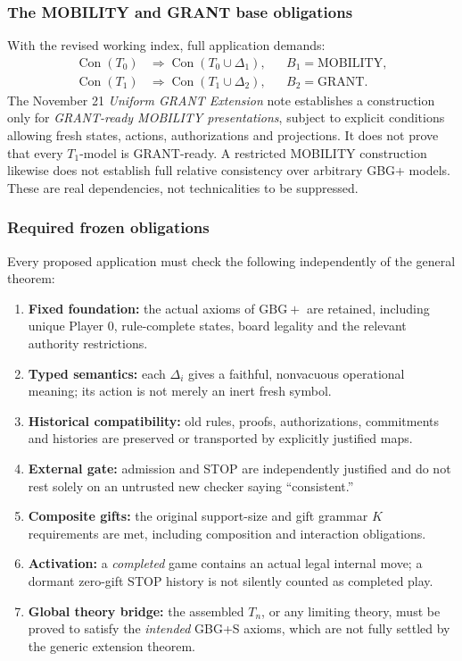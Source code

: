 \documentclass[11pt,letterpaper]{article}
\theoremstyle{definition}\newtheorem{definition}[theorem]{Definition}\newtheorem{example}[theorem]{Example}
\theoremstyle{remark}\newtheorem{remark}[theorem]{Remark}
\newcommand{\Con}{\operatorname{Con}}
\providecommand{\Gb}{\mathrm{GBG+}}
\begin{document}
\subsubsection{The MOBILITY and GRANT base obligations}

With the revised working index, full application demands:
\begin{align*}
\Con(T_0)&\Longrightarrow\Con(T_0\cup\Delta_1),
&& B_1=\mathrm{MOBILITY},\\
\Con(T_1)&\Longrightarrow\Con(T_1\cup\Delta_2),
&& B_2=\mathrm{GRANT}.
\end{align*}
The November 21 \emph{Uniform GRANT Extension} note establishes a construction only for \emph{GRANT-ready MOBILITY presentations}, subject to explicit conditions allowing fresh states, actions, authorizations and projections. It does not prove that every \(T_1\)-model is GRANT-ready. A restricted MOBILITY construction likewise does not establish full relative consistency over arbitrary GBG+ models. These are real dependencies, not technicalities to be suppressed.

\subsubsection{Required frozen obligations}

Every proposed application must check the following independently of the general theorem:
\begin{enumerate}[label=\arabic*.]
\item \textbf{Fixed foundation:} the actual axioms of \(\Gb\) are retained, including unique Player 0, rule-complete states, board legality and the relevant authority restrictions.
\item \textbf{Typed semantics:} each \(\Delta_i\) gives a faithful, nonvacuous operational meaning; its action is not merely an inert fresh symbol.
\item \textbf{Historical compatibility:} old rules, proofs, authorizations, commitments and histories are preserved or transported by explicitly justified maps.
\item \textbf{External gate:} admission and STOP are independently justified and do not rest solely on an untrusted new checker saying ``consistent.''
\item \textbf{Composite gifts:} the original support-size and gift grammar \(K\) requirements are met, including composition and interaction obligations.
\item \textbf{Activation:} a \emph{completed} game contains an actual legal internal move; a dormant zero-gift STOP history is not silently counted as completed play.
\item \textbf{Global theory bridge:} the assembled \(T_n\), or any limiting theory, must be proved to satisfy the \emph{intended} GBG+S axioms, which are not fully settled by the generic extension theorem.
\end{enumerate}
\end{document}
